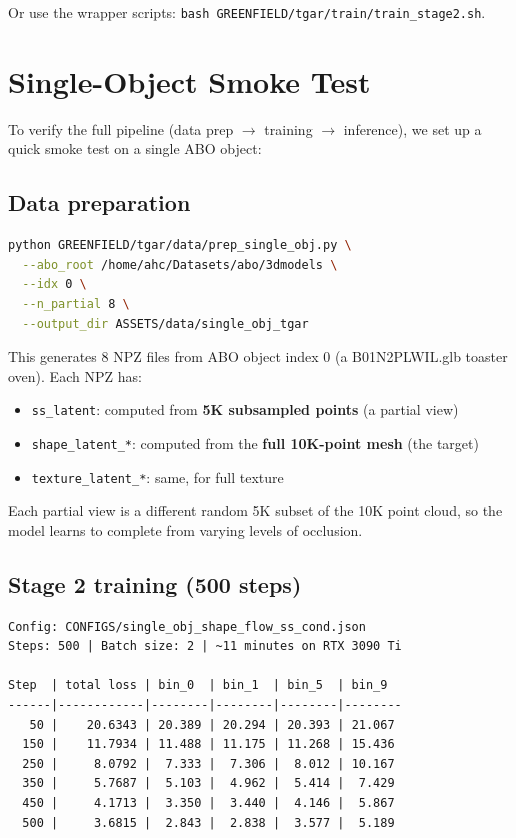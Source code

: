 Or use the wrapper scripts: \texttt{bash GREENFIELD/tgar/train/train\_stage2.sh}.

\section{Single-Object Smoke Test}

To verify the full pipeline (data prep $\rightarrow$ training $\rightarrow$ inference), we set up
a quick smoke test on a single ABO object:

\subsection{Data preparation}

\begin{lstlisting}[language=bash]
python GREENFIELD/tgar/data/prep_single_obj.py \
  --abo_root /home/ahc/Datasets/abo/3dmodels \
  --idx 0 \
  --n_partial 8 \
  --output_dir ASSETS/data/single_obj_tgar
\end{lstlisting}

This generates 8 NPZ files from ABO object index 0 (a B01N2PLWIL.glb
toaster oven). Each NPZ has:
\begin{itemize}
  \item \texttt{ss\_latent}: computed from \textbf{5K subsampled points} (a partial view)
  \item \texttt{shape\_latent\_*}: computed from the \textbf{full 10K-point mesh} (the target)
  \item \texttt{texture\_latent\_*}: same, for full texture
\end{itemize}

Each partial view is a different random 5K subset of the 10K point cloud,
so the model learns to complete from varying levels of occlusion.

\subsection{Stage 2 training (500 steps)}

\begin{lstlisting}
Config: CONFIGS/single_obj_shape_flow_ss_cond.json
Steps: 500 | Batch size: 2 | ~11 minutes on RTX 3090 Ti

Step  | total loss | bin_0  | bin_1  | bin_5  | bin_9
------|------------|--------|--------|--------|--------
   50 |    20.6343 | 20.389 | 20.294 | 20.393 | 21.067
  150 |    11.7934 | 11.488 | 11.175 | 11.268 | 15.436
  250 |     8.0792 |  7.333 |  7.306 |  8.012 | 10.167
  350 |     5.7687 |  5.103 |  4.962 |  5.414 |  7.429
  450 |     4.1713 |  3.350 |  3.440 |  4.146 |  5.867
  500 |     3.6815 |  2.843 |  2.838 |  3.577 |  5.189
\end{lstlisting}

